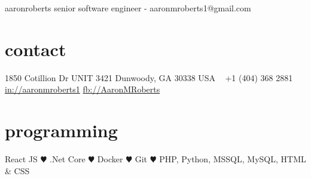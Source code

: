 \documentclass[]{friggeri-cv} %
\begin{document}
\header
{aaron}{roberts}
{senior software engineer - aaronmroberts1@gmail.com}


\begin{aside} %
\section{contact}
1850 Cotillion Dr
UNIT 3421
Dunwoody, GA 30338
USA
~
+1 (404) 368 2881
~
\href{https://www.linkedin.com/in/aaronmroberts1/}{in://aaronmroberts1}
\href{https://www.facebook.com/AaronMRoberts}{fb://AaronMRoberts}
\section{programming}
React JS {\color{red} $\varheartsuit$}
.Net Core {\color{red} $\varheartsuit$}
Docker {\color{red} $\varheartsuit$}
Git {\color{red} $\varheartsuit$}
PHP, Python, MSSQL, MySQL, HTML \& CSS
\end{aside}

\end{document}
